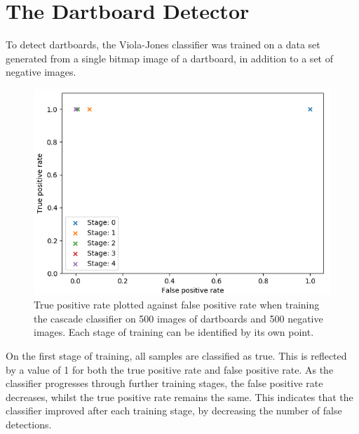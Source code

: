 \documentclass[conference]{IEEEtran}
\begin{document}
\section{The Dartboard Detector}
To detect dartboards, the Viola-Jones classifier was trained on a data set generated from a single bitmap image of a dartboard, in addition to a set of negative images. 
\begin{figure}[htbp]
\begin{center}
\includegraphics[width=0.8\linewidth]{images/TPRvsFPR}
\caption{True positive rate plotted against false positive rate when training the cascade classifier on 500 images of dartboards and 500 negative images. Each stage of training can be identified by its own point.}
\label{default}
\end{center}
\end{figure}
\par

On the first stage of training, all samples are classified as true. This is reflected by a value of 1 for both the true positive rate and false positive rate. As the classifier progresses through further training stages, the false positive rate decreases, whilst the true positive rate remains the same. This indicates that the classifier improved after each training stage, by decreasing the number of false detections. 
\par
\end{document}
